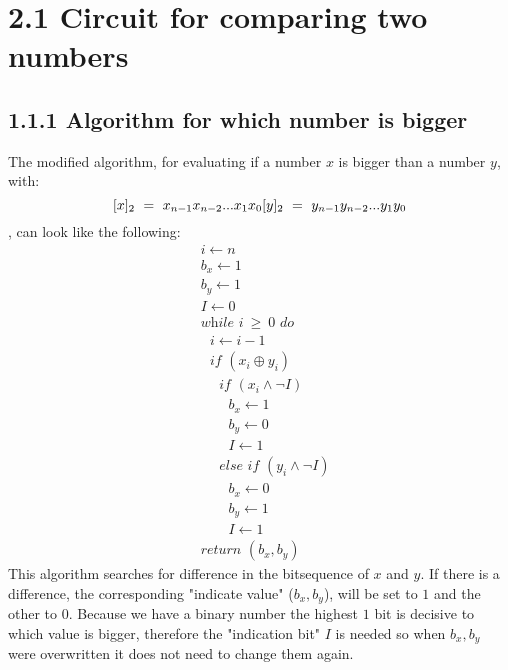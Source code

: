 \documentclass{article}
\begin{document}
	\pagestyle{fancy}
	\hfill
	
	\section*{2.1 Circuit for comparing two numbers}
	\begin{adjustwidth}{2em}{2em}
		\subsection*{1.1.1 Algorithm for which number is bigger}
		\begin{adjustwidth}{2em}{}
			The modified algorithm, for evaluating if a number $x$ is bigger than a number $y$, with:
			\[
				[x]_2 \ = \ x_{n-1}x_{n-2}...x_1x_0 $$$$
				[y]_2 \ = \ y_{n-1}y_{n-2}...y_1y_0
			\]
			, can look like the following:
			\begin{align*}
				& i \leftarrow n \\
				& b_x \leftarrow 1 \\
				& b_y \leftarrow 1 \\
				& I \leftarrow 0 \\
				& \textit{while } i \ \geq \ 0 \textit{ do} \\
				& \ \ \ i \leftarrow i-1 \\
				& \ \ \ \textit{if } (x_i \oplus y_i) \\
				& \ \ \ \ \ \ \textit{if } (x_i \wedge \neg I) \\
				& \ \ \ \ \ \ \ \ \ b_x \leftarrow 1 \\
				& \ \ \ \ \ \ \ \ \ b_y \leftarrow 0 \\
				& \ \ \ \ \ \ \ \ \ I \leftarrow 1 \\
				& \ \ \ \ \ \ \textit{else if } (y_i \wedge \neg I) \\
				& \ \ \ \ \ \ \ \ \ b_x \leftarrow 0 \\
				& \ \ \ \ \ \ \ \ \ b_y \leftarrow 1 \\
				& \ \ \ \ \ \ \ \ \ I \leftarrow 1 \\
				& \textit{return } (b_x, b_y)
			\end{align*}
			This algorithm searches for difference in the bitsequence of $x$ and $y$. If there is a difference, the corresponding "indicate value" ($b_x, b_y$), will be set to $1$ and the other to $0$. Because we have a binary number the highest $1$ bit is decisive to which value is bigger, therefore the "indication bit" $I$ is needed so when $b_x, b_y$ were overwritten it does not need to change them again.
		\end{adjustwidth}

\end{adjustwidth}
\end{document}
